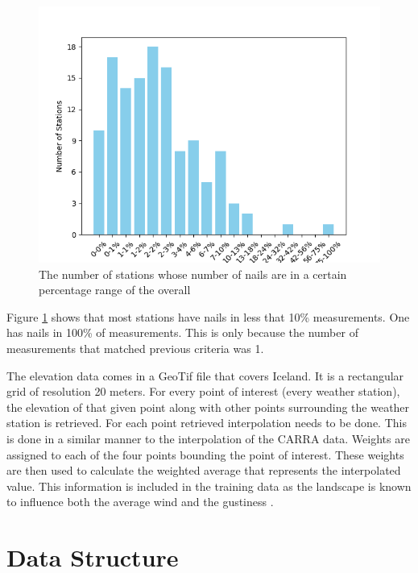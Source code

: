 \begin{figure}
    \includegraphics[scale=0.75]{Figures/error_count.png}
    \caption{The number of stations whose number of nails are in a certain percentage range of the overall}
    \label{fig:error_count}
\end{figure}

Figure \ref{fig:error_count} shows that most stations have nails in less that 10\% measurements. One has nails in 100\% of measurements. This is only because the number of measurements that matched previous criteria was 1.

The elevation data comes in a GeoTif file that covers Iceland. It is a rectangular grid of resolution 20 meters. For every point of interest (every weather station), the elevation of that given point along with other points surrounding the weather station is retrieved. For each point retrieved interpolation needs to be done. This is done in a similar manner to the interpolation of the CARRA data. Weights are assigned to each of the four points bounding the point of interest. These weights are then used to calculate the weighted average that represents the interpolated value. This information is included in the training data as the landscape is known to influence both the average wind and the gustiness \cite{GNP_vidtal}. 


\section{Data Structure}

